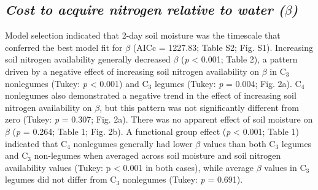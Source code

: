 \subsection{\textit{Cost to acquire nitrogen relative to water ($\beta$)}}
Model selection indicated that 2-day soil moisture was the timescale that conferred the best model fit for $\beta$ (AICc = 1227.83; Table S2; Fig. S1). Increasing soil nitrogen availability generally decreased $\beta$ (\textit{p} < 0.001; Table 2), a pattern driven by a negative effect of increasing soil nitrogen availability on $\beta$ in C$_3$ nonlegumes (Tukey: \textit{p} < 0.001) and C$_3$ legumes (Tukey: \textit{p} = 0.004; Fig. 2a). C$_4$ nonlegumes also demonstrated a negative trend in the effect of increasing soil nitrogen availability on $\beta$, but this pattern was not significantly different from zero (Tukey: \textit{p} = 0.307; Fig. 2a). There was no apparent effect of soil moisture on $\beta$ (\textit{p} = 0.264; Table 1; Fig. 2b). A functional group effect (\textit{p} < 0.001; Table 1) indicated that C$_4$ nonlegumes generally had lower $\beta$ values than both C$_3$ legumes and C$_3$ non-legumes when averaged across soil moisture and soil nitrogen availability values (Tukey: p < 0.001 in both cases), while average $\beta$ values in C$_3$ legumes did not differ from C$_3$ nonlegumes (Tukey: \textit{p} = 0.691).

